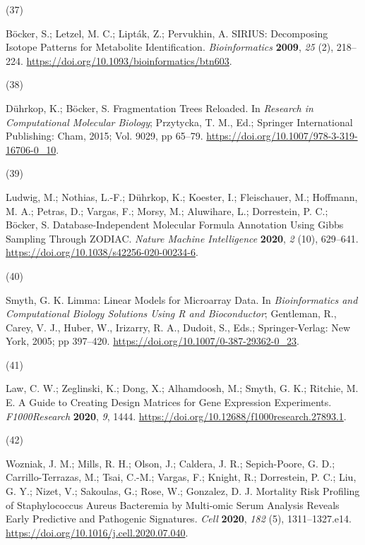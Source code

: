 \documentclass[
]{article}
\newlength{\cslhangindent}
\newlength{\csllabelwidth}
\newlength{\cslentryspacingunit} %
\newenvironment{CSLReferences}[2] %
 {%
  \setlength{\parindent}{0pt}
  \ifodd #1
  \let\oldpar\par
  \def\par{\hangindent=\cslhangindent\oldpar}
  \fi
  \setlength{\parskip}{#2\cslentryspacingunit}
 }%
 {}
\newcommand{\CSLLeftMargin}[1]{\parbox[t]{\csllabelwidth}{#1}}
\newcommand{\CSLRightInline}[1]{\parbox[t]{\linewidth - \csllabelwidth}{#1}\break}
\begin{document}
\begin{CSLReferences}{0}{0}
\leavevmode{}%
\CSLLeftMargin{(37) }%
\CSLRightInline{Böcker, S.; Letzel, M. C.; Lipták, Z.; Pervukhin, A.
{SIRIUS}: Decomposing Isotope Patterns for Metabolite
Identification\textdagger. \emph{Bioinformatics} \textbf{2009},
\emph{25} (2), 218--224.
\url{https://doi.org/10.1093/bioinformatics/btn603}.}

\leavevmode{}%
\CSLLeftMargin{(38) }%
\CSLRightInline{Dührkop, K.; Böcker, S. Fragmentation {Trees Reloaded}.
In \emph{Research in {Computational Molecular Biology}}; Przytycka, T.
M., Ed.; {Springer International Publishing}: {Cham}, 2015; Vol. 9029,
pp 65--79. \url{https://doi.org/10.1007/978-3-319-16706-0_10}.}

\leavevmode{}%
\CSLLeftMargin{(39) }%
\CSLRightInline{Ludwig, M.; Nothias, L.-F.; Dührkop, K.; Koester, I.;
Fleischauer, M.; Hoffmann, M. A.; Petras, D.; Vargas, F.; Morsy, M.;
Aluwihare, L.; Dorrestein, P. C.; Böcker, S. Database-Independent
Molecular Formula Annotation Using {Gibbs} Sampling Through {ZODIAC}.
\emph{Nature Machine Intelligence} \textbf{2020}, \emph{2} (10),
629--641. \url{https://doi.org/10.1038/s42256-020-00234-6}.}

\leavevmode{}%
\CSLLeftMargin{(40) }%
\CSLRightInline{Smyth, G. K. Limma: {Linear Models} for {Microarray
Data}. In \emph{Bioinformatics and {Computational Biology Solutions
Using R} and {Bioconductor}}; Gentleman, R., Carey, V. J., Huber, W.,
Irizarry, R. A., Dudoit, S., Eds.; {Springer-Verlag}: {New York}, 2005;
pp 397--420. \url{https://doi.org/10.1007/0-387-29362-0_23}.}

\leavevmode{}%
\CSLLeftMargin{(41) }%
\CSLRightInline{Law, C. W.; Zeglinski, K.; Dong, X.; Alhamdoosh, M.;
Smyth, G. K.; Ritchie, M. E. A Guide to Creating Design Matrices for
Gene Expression Experiments. \emph{F1000Research} \textbf{2020},
\emph{9}, 1444. \url{https://doi.org/10.12688/f1000research.27893.1}.}

\leavevmode{}%
\CSLLeftMargin{(42) }%
\CSLRightInline{Wozniak, J. M.; Mills, R. H.; Olson, J.; Caldera, J. R.;
Sepich-Poore, G. D.; Carrillo-Terrazas, M.; Tsai, C.-M.; Vargas, F.;
Knight, R.; Dorrestein, P. C.; Liu, G. Y.; Nizet, V.; Sakoulas, G.;
Rose, W.; Gonzalez, D. J. Mortality {Risk Profiling} of {Staphylococcus}
Aureus {Bacteremia} by {Multi-omic Serum Analysis Reveals Early
Predictive} and {Pathogenic Signatures}. \emph{Cell} \textbf{2020},
\emph{182} (5), 1311--1327.e14.
\url{https://doi.org/10.1016/j.cell.2020.07.040}.}


\end{CSLReferences}
\end{document}
